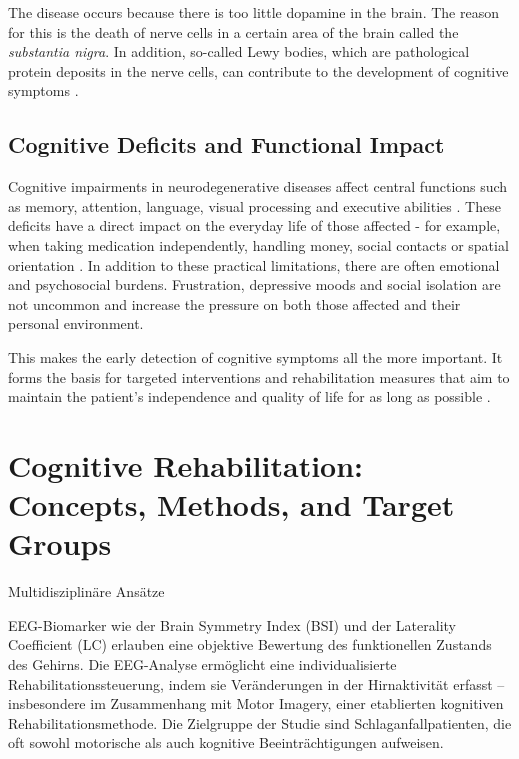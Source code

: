 The disease occurs because there is too little dopamine in the brain. The reason for this is the death of nerve cells in a certain area of the brain called the \textit{substantia nigra}. In addition, so-called Lewy bodies, which are pathological protein deposits in the nerve cells, can contribute to the development of cognitive symptoms \cite{Kalia.2015}.

\subsection{Cognitive Deficits and Functional Impact}
Cognitive impairments in neurodegenerative diseases affect central functions such as memory, attention, language, visual processing and executive abilities \cite{Harvey.2019}. These deficits have a direct impact on the everyday life of those affected - for example, when taking medication independently, handling money, social contacts or spatial orientation \cite{AmericanPsychiatricAssociation.2013}. In addition to these practical limitations, there are often emotional and psychosocial burdens. Frustration, depressive moods and social isolation are not uncommon and increase the pressure on both those affected and their personal environment.

This makes the early detection of cognitive symptoms all the more important. It forms the basis for targeted interventions and rehabilitation measures that aim to maintain the patient's independence and quality of life for as long as possible \cite{Petersen.2009}.

\section{Cognitive Rehabilitation: Concepts, Methods, and Target Groups}
Multidisziplinäre Ansätze
\cite{Zucchella.2018}

EEG-Biomarker wie der Brain Symmetry Index (BSI) und der Laterality Coefficient (LC) erlauben eine objektive Bewertung des funktionellen Zustands des Gehirns. Die EEG-Analyse ermöglicht eine individualisierte Rehabilitationssteuerung, indem sie Veränderungen in der Hirnaktivität erfasst – insbesondere im Zusammenhang mit Motor Imagery, einer etablierten kognitiven Rehabilitationsmethode.
Die Zielgruppe der Studie sind Schlaganfallpatienten, die oft sowohl motorische als auch kognitive Beeinträchtigungen aufweisen.



\cite{Campbell.2022}
    
